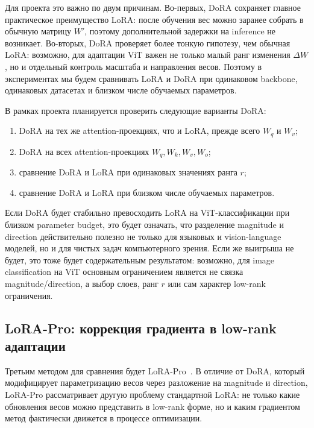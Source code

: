\documentclass[]{scrartcl}
\begin{document}
Для проекта это важно по двум причинам. Во-первых, DoRA сохраняет главное
практическое преимущество LoRA: после обучения вес можно заранее собрать в
обычную матрицу $W'$, поэтому дополнительной задержки на inference не возникает.
Во-вторых, DoRA проверяет более тонкую гипотезу, чем обычная LoRA: возможно, для
адаптации ViT важен не только малый ранг изменения $\Delta W$, но и отдельный
контроль масштаба и направления весов. Поэтому в экспериментах мы будем
сравнивать LoRA и DoRA при одинаковом backbone, одинаковых датасетах и близком
числе обучаемых параметров.

В рамках проекта планируется проверить следующие варианты DoRA:
\begin{enumerate}
    \item DoRA на тех же attention-проекциях, что и LoRA, прежде всего $W_q$ и $W_v$;
    \item DoRA на всех attention-проекциях $W_q,W_k,W_v,W_o$;
    \item сравнение DoRA и LoRA при одинаковых значениях ранга $r$;
    \item сравнение DoRA и LoRA при близком числе обучаемых параметров.
\end{enumerate}

Если DoRA будет стабильно превосходить LoRA на ViT-классификации при близком
parameter budget, это будет означать, что разделение magnitude и direction
действительно полезно не только для языковых и vision-language моделей, но и для
чистых задач компьютерного зрения. Если же выигрыша не будет, это тоже будет
содержательным результатом: возможно, для image classification на ViT основным
ограничением является не связка magnitude/direction, а выбор слоев, ранг $r$ или
сам характер low-rank ограничения.


\subsection{LoRA-Pro: коррекция градиента в low-rank адаптации}

Третьим методом для сравнения будет LoRA-Pro~\cite{wang2025lorapro}. В отличие от DoRA, который
модифицирует параметризацию весов через разложение на magnitude и direction,
LoRA-Pro рассматривает другую проблему стандартной LoRA: не только какие
обновления весов можно представить в low-rank форме, но и каким градиентом
метод фактически движется в процессе оптимизации.
\end{document}
